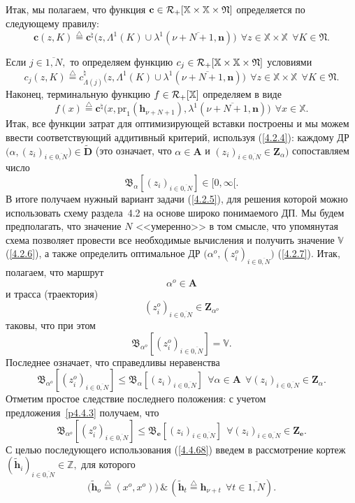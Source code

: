\documentclass[11pt,twoside,openany]{report}
\newcommand{\bfn}{\begin{equation}}
\newcommand{\efn}{\end{equation}}
\newcommand{\df}{\stackrel{\triangle}{=}}
\newcommand{\ov}{\overline}
\newcommand{\La}{\Lambda}
\newcommand{\la}{\lambda}
\newcommand{\al}{\alpha}
\newcommand{\fa}{\forall}
\newcommand{\car}{{\cal R}}
\newcommand{\bbz}{{\mathbb Z}}
\newcommand{\bbx}{{\mathbb X}}
\begin{document}
{Итак, мы полагаем, что функция $\mathbf{c}\in \car_+[\bbx \times \bbx \times
\mathfrak{N}]$ определяется по следующему правилу:
\bfn\label{4.4.62}
\mathbf{c}(z,K) \df \mathbf{c}^\natural\bigl(z,\La^1(K) \cup \la^1(\ov{\nu+N+1,
\mathbf{n}})\bigl)\ \ \fa z\in \bbx \times \bbx\ \ \fa K\in \mathfrak{N}.
\efn

Если $j\in \ov{1,N},$ то определяем функцию $c_j\in \car_+[\bbx \times \bbx \times
\mathfrak{N}]$ условиями
\bfn\label{4.4.63}
c_j(z,K) \df c_{\La(j)}^\natural\bigl(z,\La^1(K) \cup \la^1(\ov{\nu+N+1,
\mathbf{n}})\bigl)\ \ \fa z\in \bbx \times \bbx\ \ \fa K\in \mathfrak{N}.
\efn
Наконец, терминальную функцию $f\in \car_+[\bbx]$ определяем в виде
\bfn\label{4.4.64}
f(x) \df \mathbf{c}^\natural\bigl(x,\mathrm{pr}_1(\mathbf{h}_{\nu+N+1}),
\la^1(\ov{\nu+N+1,\mathbf{n}})\bigl)\ \ \fa x\in \bbx.
\efn
Итак, все функции затрат для оптимизирующей  вставки построены и мы можем
ввести соответствующий аддитивный критерий, используя (\ref{4.2.4}): каждому ДР
$\bigl(\al,(z_i)_{i\in\ov{0,N}}\bigl)\in \widetilde{\mathbf{D}}$ (это означает,
что $\al\in \mathbf{A}$ и $(z_i)_{i\in\ov{0,N}}\in \mathbf{Z}_\al)$ сопоставляем число
$$
\mathfrak{B}_\al [(z_i)_{i\in\ov{0,N}}]\in [0,\infty[.
$$
В итоге получаем нужный вариант задачи (\ref{4.2.5}), для решения которой можно
использовать схему раздела~4.2  на основе широко понимаемого ДП. Мы будем предполагать,
что значение $N$ <<умеренно>> в том смысле, что упомянутая схема позволяет провести все
необходимые вычисления и получить значение $\mathbb{V}$ (\ref{4.2.6}), а также определить
оптимальное ДР $\bigl(\al^o,(z_i^o)_{i\in\ov{0,N}}\bigl)$ (\ref{4.2.7}). Итак, полагаем,
что маршрут
\bfn\label{4.4.65}
\al^o\in \mathbf{A}
\efn
и трасса (траектория)
\bfn\label{4.4.66}(z_i^o)_{i\in\ov{0,N}}\in \mathbf{Z}_{\al^o}
\efn
таковы, что при этом
\bfn\label{4.4.67}\mathfrak{B}_{\al^o}[(z_i^o)_{i\in\ov{0,N}}] = \mathbb{V}.
\efn
Последнее означает, что справедливы неравенства
$$
\mathfrak{B}_{\al^o}[(z_i^o)_{i\in\ov{0,N}}] \leqslant \mathfrak{B}_\al[(z_i)_{i\in\ov{0,N}}]\ \
\fa \al\in \mathbf{A}\ \ \fa (z_i)_{i\in\ov{0,N}}\in \mathbf{Z}_\al.
$$
Отметим простое следствие последнего положения: с учетом предложения~\ref{p4.4.3} получаем, что
\bfn\label{4.4.68}
\mathfrak{B}_{\al^o}[(z_i^o)_{i\in\ov{0,N}}]\leqslant
\mathfrak{B}_\mathbf{e}[(z_i)_{i\in\ov{0,N}}]\ \ \fa
(z_i)_{i\in\ov{0,N}}\in \mathbf{Z}_\mathbf{e}.
\efn
С целью последующего использования (\ref{4.4.68}) введем в рассмотрение
кортеж $(\tilde{\mathbf{h}}_i)_{i\in\ov{0,N}}\in \bbz,$ для которого
$$
\bigl(\tilde{\mathbf{h}}_o \df (x^o,x^o)\bigl)\,\&\,(\tilde{\mathbf{h}}_t \df
\mathbf{h}_{\nu+t}\ \ \fa t\in \ov{1,N}).
$$

}
\end{document}
